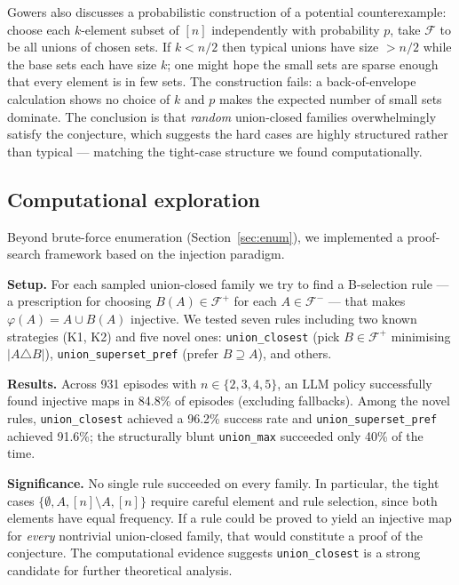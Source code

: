 \documentclass[11pt]{article}
\theoremstyle{definition}
\theoremstyle{remark}
\newcommand{\F}{\mathcal{F}}
\begin{document}
Gowers also discusses a probabilistic construction of a potential counterexample:
choose each $k$-element subset of $[n]$ independently with probability $p$,
take $\F$ to be all unions of chosen sets.
If $k < n/2$ then typical unions have size $> n/2$ while the base sets
each have size $k$; one might hope the small sets are sparse enough
that every element is in few sets.
The construction fails: a back-of-envelope calculation shows no choice
of $k$ and $p$ makes the expected number of small sets dominate.
The conclusion is that \emph{random} union-closed families overwhelmingly
satisfy the conjecture, which suggests the hard cases are highly structured
rather than typical --- matching the tight-case structure we found computationally.

\subsection{Computational exploration}
\label{sec:comp-rl}

Beyond brute-force enumeration (Section~\ref{sec:enum}), we implemented
a proof-search framework based on the injection paradigm.

\textbf{Setup.}
For each sampled union-closed family we try to find a B-selection rule ---
a prescription for choosing $B(A) \in \F^+$ for each $A \in \F^-$ ---
that makes $\varphi(A) = A \cup B(A)$ injective.
We tested seven rules including two known strategies (K1, K2) and five novel ones:
{\small\texttt{union\_closest}} (pick $B \in \F^+$ minimising $|A \triangle B|$),
{\small\texttt{union\_superset\_pref}} (prefer $B \supseteq A$), and others.

\textbf{Results.}
Across 931 episodes with $n \in \{2, 3, 4, 5\}$, an LLM policy successfully
found injective maps in 84.8\% of episodes (excluding fallbacks).
Among the novel rules,
{\small\texttt{union\_closest}} achieved a 96.2\% success rate and
{\small\texttt{union\_superset\_pref}} achieved 91.6\%;
the structurally blunt {\small\texttt{union\_max}} succeeded only 40\% of the time.

\textbf{Significance.}
No single rule succeeded on every family.
In particular, the tight cases $\{\emptyset, A, [n]\setminus A, [n]\}$ require
careful element and rule selection, since both elements have equal frequency.
If a rule could be proved to yield an injective map for \emph{every}
nontrivial union-closed family, that would constitute a proof of the conjecture.
The computational evidence suggests {\small\texttt{union\_closest}} is a strong
candidate for further theoretical analysis.
\end{document}
